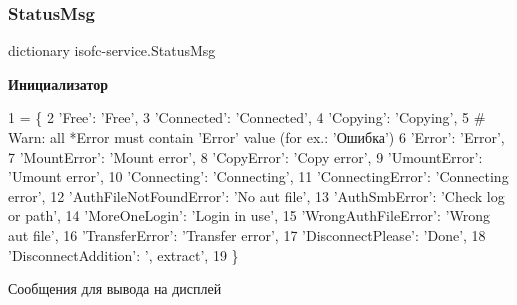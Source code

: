 \subsubsection{\texorpdfstring{Status\+Msg}{StatusMsg}}
{\footnotesize\ttfamily dictionary isofc-\/service.\+Status\+Msg}

{\bfseries Инициализатор}
\begin{DoxyCode}
1 =  \{
2     \textcolor{stringliteral}{'Free'}: \textcolor{stringliteral}{'Free'},
3     \textcolor{stringliteral}{'Connected'}: \textcolor{stringliteral}{'Connected'},
4     \textcolor{stringliteral}{'Copying'}: \textcolor{stringliteral}{'Copying'},
5     \textcolor{comment}{# Warn: all *Error must contain 'Error' value (for ex.: 'Ошибка')}
6     \textcolor{stringliteral}{'Error'}: \textcolor{stringliteral}{'Error'},
7     \textcolor{stringliteral}{'MountError'}: \textcolor{stringliteral}{'Mount error'},
8     \textcolor{stringliteral}{'CopyError'}: \textcolor{stringliteral}{'Copy error'},
9     \textcolor{stringliteral}{'UmountError'}: \textcolor{stringliteral}{'Umount error'},
10     \textcolor{stringliteral}{'Connecting'}: \textcolor{stringliteral}{'Connecting'},
11     \textcolor{stringliteral}{'ConnectingError'}: \textcolor{stringliteral}{'Connecting error'},
12     \textcolor{stringliteral}{'AuthFileNotFoundError'}: \textcolor{stringliteral}{'No aut file'},
13     \textcolor{stringliteral}{'AuthSmbError'}: \textcolor{stringliteral}{'Check log or path'},
14     \textcolor{stringliteral}{'MoreOneLogin'}: \textcolor{stringliteral}{'Login in use'},
15     \textcolor{stringliteral}{'WrongAuthFileError'}: \textcolor{stringliteral}{'Wrong aut file'},
16     \textcolor{stringliteral}{'TransferError'}: \textcolor{stringliteral}{'Transfer error'},
17     \textcolor{stringliteral}{'DisconnectPlease'}: \textcolor{stringliteral}{'Done'},
18     \textcolor{stringliteral}{'DisconnectAddition'}: \textcolor{stringliteral}{', extract'},
19 \}
\end{DoxyCode}


Сообщения для вывода на дисплей 

